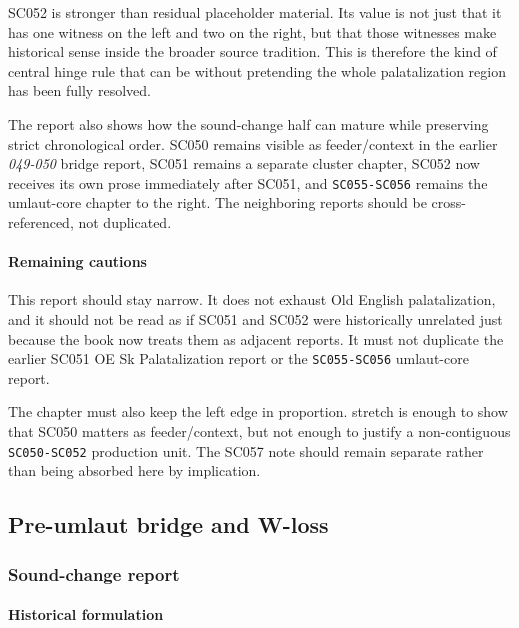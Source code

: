 \documentclass[
  british,
  a4paper,
]{article}
\begin{document}
SC052 is stronger than residual placeholder material. Its value is not
just that it has one witness on the left and two on the right, but that
those witnesses make historical sense inside the broader source
tradition. This is therefore the kind of central hinge rule that can be
without pretending the whole palatalization region has been fully
resolved.

The report also shows how the sound-change half can mature while
preserving strict chronological order. SC050 remains visible as
feeder/context in the earlier \emph{049-050} bridge report, SC051
remains a separate cluster chapter, SC052 now receives its own prose
immediately after SC051, and \texttt{SC055-SC056} remains the
umlaut-core chapter to the right. The neighboring reports should be
cross-referenced, not duplicated.

\paragraph{Remaining cautions}\label{remaining-cautions-32}

This report should stay narrow. It does not exhaust Old English
palatalization, and it should not be read as if SC051 and SC052 were
historically unrelated just because the book now treats them as adjacent
reports. It must not duplicate the earlier SC051 OE Sk Palatalization
report or the \texttt{SC055-SC056} umlaut-core report.

The chapter must also keep the left edge in proportion. stretch is
enough to show that SC050 matters as feeder/context, but not enough to
justify a non-contiguous \texttt{SC050-SC052} production unit. The SC057
note should remain separate rather than being absorbed here by
implication.

\subsection{Pre-umlaut bridge and
W-loss}\label{pre-umlaut-bridge-and-w-loss}

\subsubsection{Sound-change report}\label{sound-change-report-33}

\paragraph{Historical formulation}\label{historical-formulation-33}
\end{document}
